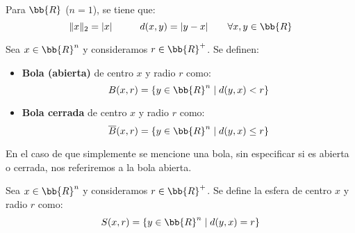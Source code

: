 \begin{ejemplo}
    Para $\bb{R}$ ($n=1$), se tiene que:
    \begin{equation*}
        \|x\|_2 = |x| \hspace{1cm} d(x,y)=|y-x| \qquad \forall x,y\in \bb{R}
    \end{equation*}
\end{ejemplo}

\begin{definicion}[Bola] Sea $x\in \bb{R}^n$ y consideramos $r\in \bb{R}^+$. Se definen:
    \begin{itemize}
        \item \textbf{Bola (abierta)} de centro $x$ y radio $r$ como:
        \begin{equation*}
            B(x,r) = \{y\in \bb{R}^n \mid d(y,x)<r\}
        \end{equation*}

        \item \textbf{Bola cerrada} de centro $x$ y radio $r$ como:
        \begin{equation*}
            \overline{B}(x,r) = \{y\in \bb{R}^n \mid d(y,x)\leq r\}
        \end{equation*}
    \end{itemize}

    En el caso de que simplemente se mencione una bola, sin especificar si es abierta o cerrada, nos referiremos a la bola abierta.
\end{definicion}

\begin{definicion}[Esfera] Sea $x\in \bb{R}^n$ y consideramos $r\in \bb{R}^+$. Se define la esfera de centro $x$ y radio $r$ como:
    \begin{equation*}
        S(x,r) = \{y\in \bb{R}^n \mid d(y,x)=r\}
    \end{equation*}
\end{definicion}

